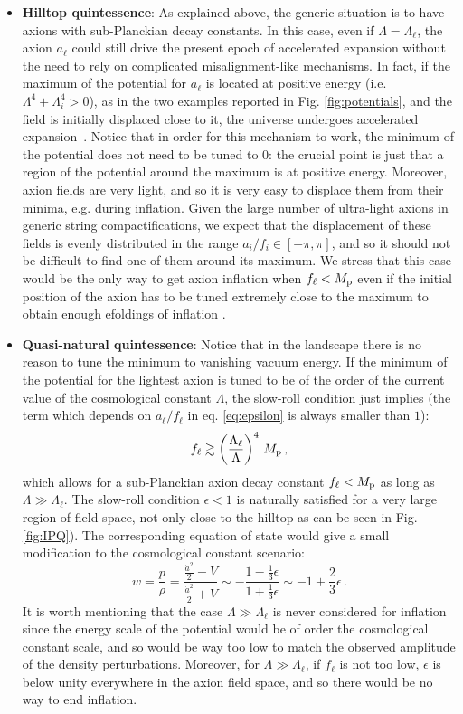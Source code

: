 \documentclass[11pt,a4paper]{article}
\newcommand{\be}{\begin{equation}}
\newcommand{\ee}{\end{equation}}
\begin{document}
\begin{itemize}
\item \textbf{Hilltop quintessence}: As explained above, the generic situation is to have axions with sub-Planckian decay constants. In this case, even if $\Lambda = \Lambda_\ell$, the axion $a_\ell$ could still drive the present epoch of accelerated expansion without the need to rely on complicated misalignment-like mechanisms. In fact, if the maximum of the potential for $a_\ell$ is located at positive energy (i.e. $\Lambda^4 + \Lambda_i^4 > 0$), as in the two examples reported in Fig. \ref{fig:potentials}, and the field is initially displaced close to it, the universe undergoes accelerated expansion~\cite{Kamionkowski:2014zda}. Notice that in order for this mechanism to work, the minimum of the potential does not need to be tuned to $0$: the crucial point is just that a region of the potential around the maximum is at positive energy. Moreover, axion fields are very light, and so it is very easy to displace them from their minima, e.g. during inflation. Given the large number of ultra-light axions in generic string compactifications, we expect that the displacement of these fields is evenly distributed in the range $a_i/f_i \in [-\pi,\pi]$, and so it should not be difficult to find one of them around its maximum. We stress that this case would be the only way to get axion inflation when $f_\ell < M_{\rm p}$ even if the initial position of the axion has to be tuned extremely close to the maximum to obtain enough efoldings of inflation \cite{BlancoPillado:2004ns}.

\item \textbf{Quasi-natural quintessence}: Notice that in the landscape there is no reason to tune the minimum to vanishing vacuum energy. If the minimum of the potential for the lightest axion is tuned to be of the order of the current value of the cosmological constant $\Lambda$, the slow-roll condition just implies (the term which depends on $a_\ell/f_\ell$ in eq. \eqref{eq:epsilon} is always smaller than $1$):
\be
f_{\ell}\gtrsim \left(\frac{\Lambda_\ell}{\Lambda}\right)^4\,M_{\rm p}\,,
\label{eq:IPQ}
\ee
which allows for a sub-Planckian axion decay constant $f_\ell<M_{\rm p}$ as long as $\Lambda \gg \Lambda_\ell$. The slow-roll condition $\epsilon<1$ is naturally satisfied for a very large region of field space, not only close to the hilltop as can be seen in Fig. \ref{fig:IPQ}). The corresponding equation of state would give a small modification to the cosmological constant scenario:
\be
w=\frac{p}{\rho}=\frac{\frac{{\dot a}^2}{2}-V}{\frac{{\dot a}^2}{2}+V}\sim -\frac{1-\frac13 \epsilon}{1+\frac13 \epsilon}\sim -1 + \frac{2}{3}\epsilon \,.
\ee
It is worth mentioning that the case $\Lambda \gg \Lambda_\ell$ is never considered for inflation since the energy scale of the potential would be of order the cosmological constant scale, and so would be way too low to match the observed amplitude of the density perturbations. Moreover, for $\Lambda \gg \Lambda_\ell$, if $f_\ell$ is not too low, $\epsilon$ is below unity everywhere in the axion field space, and so there would be no way to end inflation.


\end{itemize}
\end{document}
